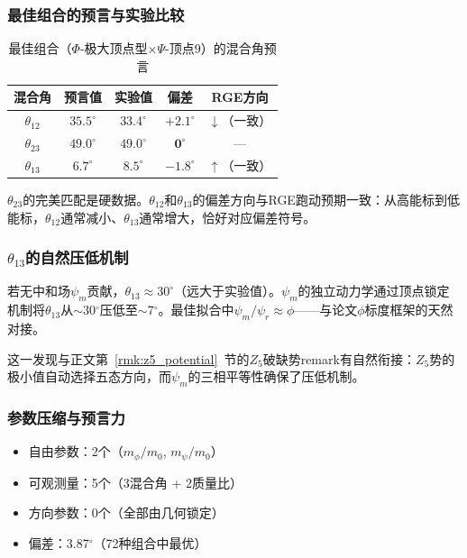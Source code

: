 \subsubsection{最佳组合的预言与实验比较}

\begin{table}[htbp]
\centering
\caption{最佳组合（$\Phi$-极大顶点型$\times\Psi$-顶点9）的混合角预言}
\label{tab:mixing_angles}
\begin{tabular}{ccccc}
\hline
混合角 & 预言值 & 实验值 & 偏差 & RGE方向 \\
\hline
$\theta_{12}$ & $35.5^\circ$ & $33.4^\circ$ & $+2.1^\circ$ & $\downarrow$（一致） \\
$\theta_{23}$ & $49.0^\circ$ & $49.0^\circ$ & $\mathbf{0^\circ}$ & — \\
$\theta_{13}$ & $6.7^\circ$ & $8.5^\circ$ & $-1.8^\circ$ & $\uparrow$（一致） \\
\hline
\end{tabular}
\end{table}

$\theta_{23}$的完美匹配是硬数据。$\theta_{12}$和$\theta_{13}$的偏差方向与RGE跑动预期一致：从高能标到低能标，$\theta_{12}$通常减小、$\theta_{13}$通常增大，恰好对应偏差符号。

\subsubsection{$\theta_{13}$的自然压低机制}

\begin{remark}
\label{rmk:theta13_suppress}
若无中和场$\psi_m$贡献，$\theta_{13}\approx 30^\circ$（远大于实验值）。$\psi_m$的独立动力学通过顶点锁定机制将$\theta_{13}$从$\sim$30$^\circ$压低至$\sim$7$^\circ$。最佳拟合中$\psi_m/\psi_r \approx \phi$——与论文$\phi$标度框架的天然对接。
\end{remark}

这一发现与正文第~\ref{rmk:z5_potential}~节的$Z_5$破缺势remark有自然衔接：$Z_5$势的极小值自动选择五态方向，而$\psi_m$的三相平等性确保了压低机制。

\subsubsection{参数压缩与预言力}

\begin{itemize}
\item 自由参数：2个（$m_\phi/m_0$, $m_\psi/m_0$）
\item 可观测量：5个（3混合角 + 2质量比）
\item 方向参数：0个（全部由几何锁定）
\item 偏差：3.87$^\circ$（72种组合中最优）
\end{itemize}

